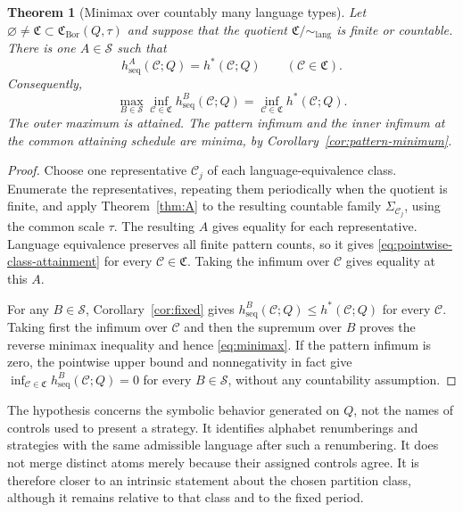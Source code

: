 \documentclass[11pt,reqno]{amsart}
\numberwithin{equation}{section}
\newtheorem{theorem}{Theorem}[section]
\theoremstyle{definition}
\newcommand{\C}{\mathcal C}
\newcommand{\hseq}{h_{\mathrm{seq}}}
\newcommand{\hpat}{h^{*}}
\newcommand{\Bor}{\mathrm{Bor}}
\newcommand{\lang}{\mathrm{lang}}
\begin{document}
\begin{theorem}[Minimax over countably many language types]\label{thm:B}
Let $\varnothing\ne\mathfrak C\subset\mathfrak C_{\Bor}(Q,\tau)$ and suppose
that the quotient $\mathfrak C/{\sim_{\lang}}$ is finite or countable.  There
is one $A\in\mathscr S$ such that
\begin{equation}\label{eq:pointwise-class-attainment}
 \hseq^A(\C;Q)=\hpat(\C;Q)
 \qquad(\C\in\mathfrak C).
\end{equation}
Consequently,
\begin{equation}\label{eq:minimax}
 \max_{B\in\mathscr S}\inf_{\C\in\mathfrak C}
 \hseq^B(\C;Q)
 =\inf_{\C\in\mathfrak C}\hpat(\C;Q).
\end{equation}
The outer maximum is attained. The pattern infimum and the inner infimum at the common attaining schedule are minima, by Corollary~\ref{cor:pattern-minimum}.
\end{theorem}

\begin{proof}
Choose one representative $\C_j$ of each language-equivalence class.
Enumerate the representatives, repeating them periodically when the quotient
is finite, and apply Theorem~\ref{thm:A} to the resulting countable family
$\Sigma_{\C_j}$, using the common scale $\tau$.  The resulting $A$ gives equality for each
representative.  Language equivalence preserves all finite pattern counts, so
it gives \eqref{eq:pointwise-class-attainment} for every $\C\in\mathfrak C$.
Taking the infimum over $\C$ gives equality at this $A$.

For any $B\in\mathscr S$, Corollary~\ref{cor:fixed} gives
$\hseq^B(\C;Q)\le\hpat(\C;Q)$ for every $\C$.  Taking first the infimum over
$\C$ and then the supremum over $B$ proves the reverse minimax inequality and
hence \eqref{eq:minimax}.  If the pattern infimum is zero, the pointwise upper
bound and nonnegativity in fact give
$\inf_{\C\in\mathfrak C}\hseq^B(\C;Q)=0$ for every $B\in\mathscr S$, without
any countability assumption.
\end{proof}

The hypothesis concerns the symbolic behavior generated on $Q$, not the
names of controls used to present a strategy.  It identifies alphabet renumberings and strategies with the same
admissible language after such a renumbering. It does not merge distinct
atoms merely because their assigned controls agree.  It is therefore closer to an intrinsic
statement about the chosen partition class, although it remains relative to
that class and to the fixed period.
\end{document}
